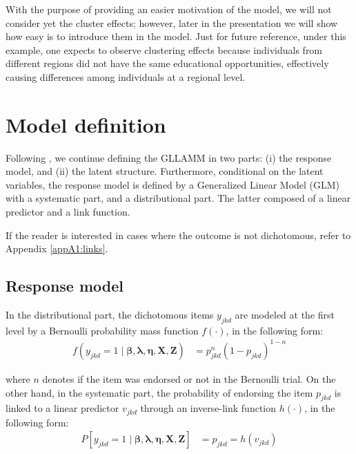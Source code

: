 With the purpose of providing an easier motivation of the model, we will not consider yet the cluster effects; however, later in the presentation we will show how easy is to introduce them in the model. Just for future reference, under this example, one expects to observe clustering effects because individuals from different regions did not have the same educational opportunities, effectively causing differences among individuals at a regional level.


\section{Model definition} \label{sect:definition}

Following \citet{Rabe_et_al_2004a, Rabe_et_al_2004b}, we continue defining the GLLAMM in two parts: (i) the response model, and (ii) the latent structure. Furthermore, conditional on the latent variables, the response model is defined by a Generalized Linear Model (GLM) \cite{Nelder_et_al_1972, Nelder_et_al_1989} with a systematic part, and a distributional part. The latter composed of a linear predictor and a link function.

If the reader is interested in cases where the outcome is not dichotomous, refer to Appendix \ref{appA1:links}.

\subsection{Response model} \label{s_sect:response}

In the distributional part, the dichotomous items $y_{jkd}$ are modeled at the first level by a Bernoulli probability mass function $f(\cdot)$, in the following form:
\begin{equation} \label{eq:distributional}
	\begin{split}
		f \left( y_{jkd}=1 \; | \; \pmb{\beta}, \pmb{\lambda}, \pmb{\eta}, \mathbf{X}, \mathbf{Z} \right) &= p_{jkd}^{n} (1 - p_{jkd})^{1-n}
	\end{split}
\end{equation}

\noindent where $n$ denotes if the item was endorsed or not in the Bernoulli trial. On the other hand, in the systematic part, the probability of endorsing the item $p_{jkd}$ is linked to a linear predictor $v_{jkd}$ through an inverse-link function $h(\cdot)$, in the following form:
\begin{equation} \label{eq:systematic}
	\begin{split}
		P\left[ y_{jkd}=1 \; | \; \pmb{\beta}, \pmb{\lambda}, \pmb{\eta}, \mathbf{X}, \mathbf{Z} \right] &= p_{jkd} = h(v_{jkd})
	\end{split}	
\end{equation}

